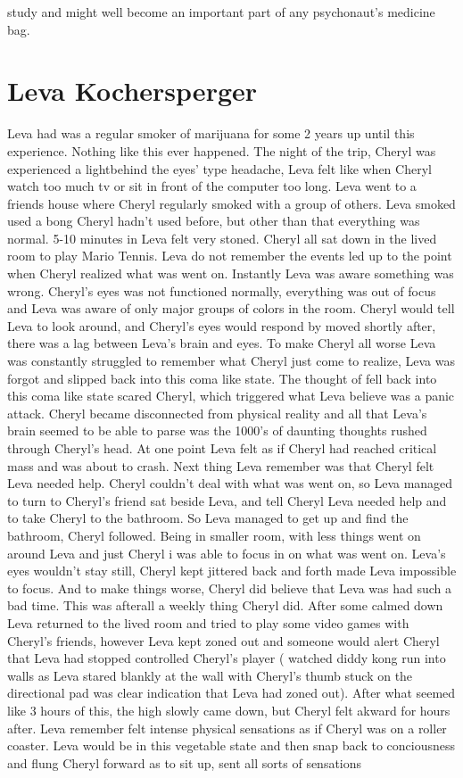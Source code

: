 \documentclass[12pt]{book}
\begin{document}
study and might well become an important part of any psychonaut's medicine bag.



\chapter{Leva Kochersperger}

Leva had was a regular smoker of marijuana for some 2 years up until this experience. Nothing like this ever happened. The night of the trip, Cheryl was experienced a lightbehind the eyes' type headache, Leva felt like when Cheryl watch too much tv or sit in front of the computer too long. Leva went to a friends house where Cheryl regularly smoked with a group of others. Leva smoked used a bong Cheryl hadn't used before, but other than that everything was normal. 5-10 minutes in Leva felt very stoned. Cheryl all sat down in the lived room to play Mario Tennis. Leva do not remember the events led up to the point when Cheryl realized what was went on. Instantly Leva was aware something was wrong. Cheryl's eyes was not functioned normally, everything was out of focus and Leva was aware of only major groups of colors in the room. Cheryl would tell Leva to look around, and Cheryl's eyes would respond by moved shortly after, there was a lag between Leva's brain and eyes. To make Cheryl all worse Leva was constantly struggled to remember what Cheryl just come to realize, Leva was forgot and slipped back into this coma like state. The thought of fell back into this coma like state scared Cheryl, which triggered what Leva believe was a panic attack. Cheryl became disconnected from physical reality and all that Leva's brain seemed to be able to parse was the 1000's of daunting thoughts rushed through Cheryl's head. At one point Leva felt as if Cheryl had reached critical mass and was about to crash. Next thing Leva remember was that Cheryl felt Leva needed help. Cheryl couldn't deal with what was went on, so Leva managed to turn to Cheryl's friend sat beside Leva, and tell Cheryl Leva needed help and to take Cheryl to the bathroom. So Leva managed to get up and find the bathroom, Cheryl followed. Being in smaller room, with less things went on around Leva and just Cheryl i was able to focus in on what was went on. Leva's eyes wouldn't stay still, Cheryl kept jittered back and forth made Leva impossible to focus. And to make things worse, Cheryl did believe that Leva was had such a bad time. This was afterall a weekly thing Cheryl did. After some calmed down Leva returned to the lived room and tried to play some video games with Cheryl's friends, however Leva kept zoned out and someone would alert Cheryl that Leva had stopped controlled Cheryl's player ( watched diddy kong run into walls as Leva stared blankly at the wall with Cheryl's thumb stuck on the directional pad was clear indication that Leva had zoned out). After what seemed like 3 hours of this, the high slowly came down, but Cheryl felt akward for hours after. Leva remember felt intense physical sensations as if Cheryl was on a roller coaster. Leva would be in this vegetable state and then snap back to conciousness and flung Cheryl forward as to sit up, sent all sorts of sensations 
\end{document}
